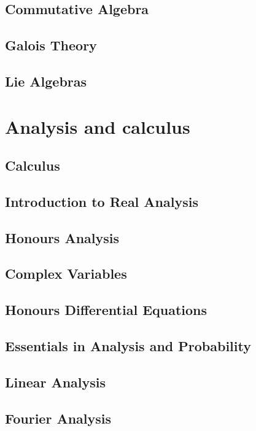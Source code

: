 \documentclass[12pt]{report}
\begin{document}
\chapter{Commutative Algebra}\label{cha:commutative-algebra}
\chapter{Galois Theory}\label{cha:galois-theory}
\chapter{Lie Algebras}\label{cha:lie-algebras}



\part{Analysis and calculus}
\chapter{Calculus}\label{cha:calculus}
\chapter{Introduction to Real Analysis}\label{cha:intr-real-analys}
\chapter{Honours Analysis}\label{cha:honours-analysis}
\chapter{Complex Variables}\label{cha:complex-variables}
\chapter{Honours Differential Equations}\label{cha:hono-diff-equat}
\chapter{Essentials in Analysis and Probability\label{cha:essent-analys-prob}}
\chapter{Linear Analysis}\label{cha:linear-analysis}
\chapter{Fourier Analysis}\label{cha:fourier-analysis}
\end{document}

